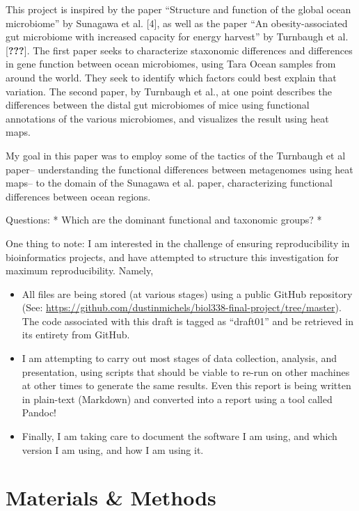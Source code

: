 \documentclass[12pt,a4paper,]{article}
\providecommand{\tightlist}{%
  \setlength{\itemsep}{0pt}\setlength{\parskip}{0pt}}
\begin{document}
This project is inspired by the paper ``Structure and function of the
global ocean microbiome'' by Sunagawa et al. {[}4{]}, as well as the
paper ``An obesity-associated gut microbiome with increased capacity for
energy harvest'' by Turnbaugh et al. {[}{\textbf{???}}{]}. The first
paper seeks to characterize staxonomic differences and differences in
gene function between ocean microbiomes, using Tara Ocean samples from
around the world. They seek to identify which factors could best explain
that variation. The second paper, by Turnbaugh et al., at one point
describes the differences between the distal gut microbiomes of mice
using functional annotations of the various microbiomes, and visualizes
the result using heat maps.

My goal in this paper was to employ some of the tactics of the Turnbaugh
et al paper-- understanding the functional differences between
metagenomes using heat maps-- to the domain of the Sunagawa et al.
paper, characterizing functional differences between ocean regions.

Questions: * Which are the dominant functional and taxonomic groups? *

One thing to note: I am interested in the challenge of ensuring
reproducibility in bioinformatics projects, and have attempted to
structure this investigation for maximum reproducibility. Namely,

\begin{itemize}
\tightlist
\item
  All files are being stored (at various stages) using a public GitHub
  repository (See:
  \url{https://github.com/dustinmichels/biol338-final-project/tree/master}).
  The code associated with this draft is tagged as ``draft01'' and be
  retrieved in its entirety from GitHub.
\item
  I am attempting to carry out most stages of data collection, analysis,
  and presentation, using scripts that should be viable to re-run on
  other machines at other times to generate the same results. Even this
  report is being written in plain-text (Markdown) and converted into a
  report using a tool called Pandoc!
\item
  Finally, I am taking care to document the software I am using, and
  which version I am using, and how I am using it.
\end{itemize}

\section{Materials \& Methods}\label{materials-methods}
\end{document}
